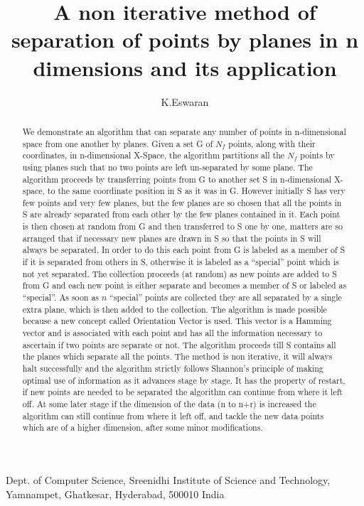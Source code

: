 \documentclass[english]{article}
\newcommand{\lyxaddress}[1]{
\par {\raggedright #1
\vspace{1.4em}
\noindent\par}
}
\begin{document}
\title{A non iterative method of separation of points by planes in n dimensions and its
application}


\author{K.Eswaran}

\maketitle

\lyxaddress{Dept. of Computer Science, Sreenidhi Institute of Science and Technology,
Yamnampet, Ghatkesar, Hyderabad, 500010 India }
\begin{abstract}
We demonstrate an algorithm that can separate any number of points
in n-dimensional space from one another by planes. Given a set G of $N_{f}$ points, along with their coordinates, in n-dimensional X-Space, the algorithm partitions all the $N_{f}$ points by using planes such that no two points are left un-separated
by some plane. The algorithm proceeds by transferring points from G to another set S in n-dimensional X-space, to the same coordinate position in S as it was in G. However initially S has very few points and very few planes, but the few planes are so chosen that all the points in S are already separated from each other by the few planes contained in it.  Each point is then chosen at random from G and then transferred to S one by one, matters are so arranged that if necessary new planes are drawn in S so that the points in S will always be separated. In order to do this each point from G is labeled as a member of S if it is separated from others in S, otherwise it is labeled as a ``special'' 
point which is not yet separated. The collection proceeds (at random)
as new points are added to S from G and each new point is either separate and becomes a member of S or labeled as ``special''. As soon as $n$ ``special'' points are collected
they are all separated by a single extra plane, which is then added to
the collection. The algorithm is made possible because a new concept
called Orientation Vector is used. This vector is a Hamming vector
and is associated with each point and has all the information necessary
to ascertain if two points are separate or not. The algorithm proceeds
till S contains all the planes which separate all the points. The
method is non iterative, it will always halt successfully and the
algorithm strictly follows Shannon's principle of making optimal use
of information as it advances stage by stage. It has the property
of restart, if new points are needed to be separated the algorithm
can continue from where it left off. At some later stage if the dimension
of the data (n to n+r) is increased the algorithm can still continue
from where it left off, and tackle the new data points which are of
a higher dimension, after some minor modifications. 


\end{abstract}
\end{document}
